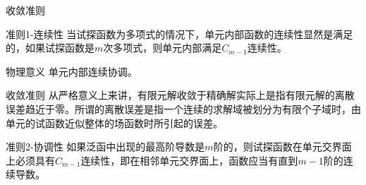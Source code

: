 \documentclass[11pt]{beamer}
\begin{document}
\begin{frame}{收敛准则}
\begin{block}{准则1-连续性}
当试探函数为多项式的情况下，单元内部函数的连续性显然是满足的，如果试探函数是$m$次多项式，则单元内部满足$C_{m-1}$连续性。
\end{block}
\begin{block}{物理意义}
单元内部连续协调。
\end{block}
\end{frame}

\begin{frame}{收敛准则}
从严格意义上来讲，有限元解收敛于精确解实际上是指有限元解的离散误差趋近于零。所谓的离散误差是指一个连续的求解域被划分为有限个子域时，由单元的试函数近似整体的场函数时所引起的误差。
\begin{block}{准则2-协调性}
如果泛函中出现的最高阶导数是$m$阶的，则试探函数在单元交界面上必须具有$C_{m-1}$连续性，即在相邻单元交界面上，函数应当有直到$m-1$阶的连续导数。
\end{block}

\end{frame}

\end{document}
